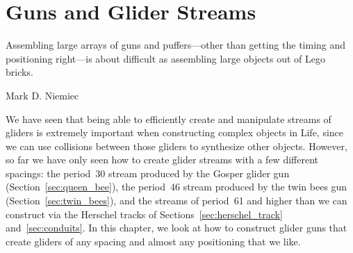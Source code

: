 

\renewcommand{\chapterfolder}{glider_guns/}
\chapter{Guns and Glider Streams}\label{chp:guns}


\vspace*{-0.4in}
\epigraph{Assembling large arrays of guns and puffers---other than getting the timing and positioning right---is about difficult as assembling large objects out of Lego bricks.}{Mark D. Niemiec}
\vspace*{0.4in}


\noindent We have seen that being able to efficiently create and manipulate streams of gliders is extremely important when constructing complex objects in Life, since we can use collisions between those gliders to synthesize other objects. However, so far we have only seen how to create glider streams with a few different spacings: the period~30 stream produced by the Gosper glider gun (Section~\ref{sec:queen_bee}), the period~46 stream produced by the twin bees gun (Section~\ref{sec:twin_bees}), and the streams of period~61 and higher than we can construct via the Herschel tracks of Sections~\ref{sec:herschel_track} and~\ref{sec:conduits}. In this chapter, we look at how to construct glider guns that create gliders of any spacing and almost any positioning that we like.


